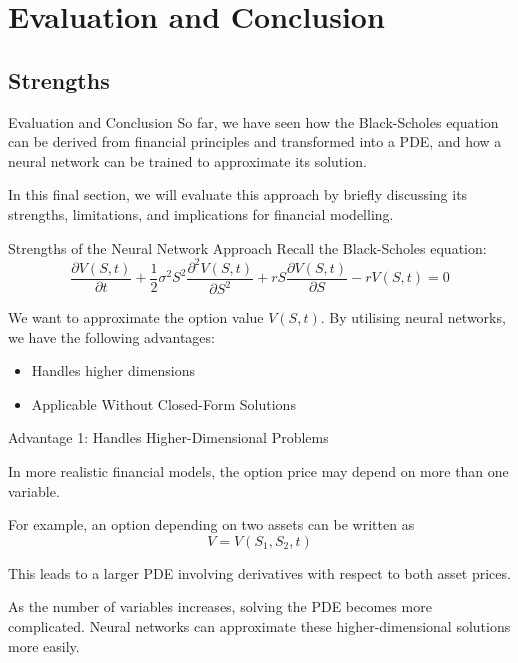 \section{Evaluation and Conclusion}

\subsection{Strengths}

\begin{frame}{Evaluation and Conclusion}
So far, we have seen how the Black-Scholes equation can be derived from financial principles and transformed into a PDE, and how a neural
network can be trained to approximate its solution. \vspace{0.4cm}

In this final section, we will evaluate this approach by briefly discussing its strengths, limitations, and implications for financial modelling.
\end{frame}

\begin{frame}{Strengths of the Neural Network Approach}
Recall the Black-Scholes equation: \[
\frac{\partial V(S,t)}{\partial t}
+ \frac{1}{2}\sigma^2 S^2 \frac{\partial^2 V(S,t)}{\partial S^2}
+ rS \frac{\partial V(S,t)}{\partial S}
- rV(S,t) = 0
\]

\vspace{0.5cm}

We want to approximate the option value $V(S,t)$. By utilising neural networks, we have the following advantages:  
\begin{itemize}
    \item Handles higher dimensions
    \item Applicable Without Closed-Form Solutions
\end{itemize}

\end{frame}

\begin{frame}{Advantage 1: Handles Higher-Dimensional Problems}

In more realistic financial models, the option price may depend on
more than one variable.

\vspace{0.3cm}

For example, an option depending on two assets can be written as
\[
V = V(S_1,S_2,t)
\]

This leads to a larger PDE involving derivatives with respect to
both asset prices.

\vspace{0.3cm}

As the number of variables increases, solving the PDE becomes
more complicated. Neural networks can approximate these
higher-dimensional solutions more easily.

\end{frame}

